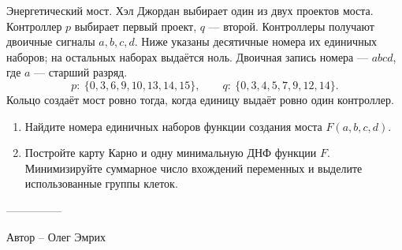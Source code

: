 \question
Энергетический мост. Хэл Джордан выбирает один из двух проектов моста. Контроллер $p$ выбирает первый проект, $q$ --- второй. Контроллеры получают двоичные сигналы $a,b,c,d$. Ниже указаны десятичные номера их единичных наборов; на остальных наборах выдаётся ноль. Двоичная запись номера --- $abcd$, где $a$ --- старший разряд.
\[
p:\ \{0, 3, 6, 9, 10, 13, 14, 15\},\qquad q:\ \{0, 3, 4, 5, 7, 9, 12, 14\}.
\]
Кольцо создаёт мост ровно тогда, когда единицу выдаёт ровно один контроллер.
\begin{enumerate}
\item Найдите номера единичных наборов функции создания моста $F(a,b,c,d)$.
\item Постройте карту Карно и одну минимальную ДНФ функции $F$. Минимизируйте суммарное число вхождений переменных и выделите использованные группы клеток.
\end{enumerate}

---------------

Автор -- Олег Эмрих
